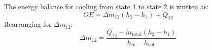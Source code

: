 The energy balance for cooling from state 1 to state 2 is written as:  
\[
OE = \Delta m_{12} (h_2 - h_1) + Q_{12}
\]  
Rearranging for \( \Delta m_{12} \):  
\[
\Delta m_{12} = \frac{Q_{12} - \dot{m}_{\text{total}} (h_2 - h_1)}{h_{\text{in}} - h_{\text{out}}}
\]